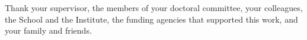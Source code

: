 \begin{acknowledgements}
Thank your supervisor, the members of your doctoral committee, your colleagues,
the School and the Institute, the funding agencies that supported this work, and
your family and friends.
\end{acknowledgements}
